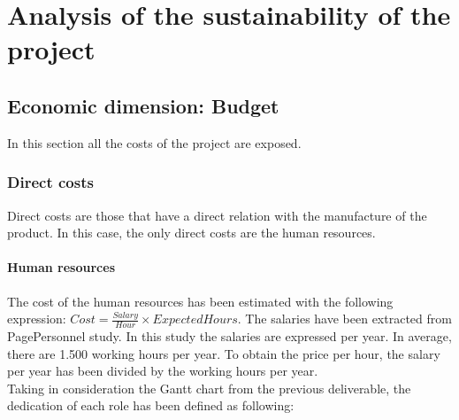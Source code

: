 \chapter{Analysis of the sustainability of the project}
\label{Chapter2}
%

\section{Economic dimension: Budget}
In this section all the costs of the project are exposed. 
\subsection{Direct costs}
Direct costs are those that have a direct relation with the manufacture of the product. In this case, the only direct costs are the human resources. 

\subsubsection{Human resources}
The cost of the human resources has been estimated with the following expression: $Cost = \frac{Salary}{Hour} \times Expected Hours$. The salaries have been extracted from PagePersonnel study\cite{PagePersonnel}. In this study the salaries are expressed per year. In average, there are 1.500 working hours per year. To obtain the price per hour, the salary per year has been divided by the working hours per year.\\

Taking in consideration the Gantt chart from the previous deliverable, the dedication of each role has been defined as following:

